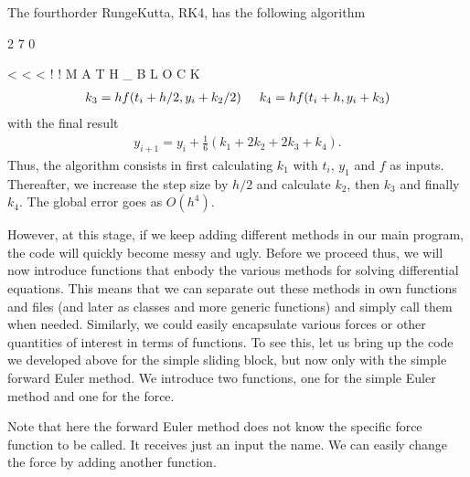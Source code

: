 \documentclass[letterpaper,10pt,english]{sphinxmanual}
\begin{document}
The fourth\sphinxhyphen{}order Runge\sphinxhyphen{}Kutta, RK4, has the following algorithm

2
7
0

\textless{}
\textless{}
\textless{}
!
!
M
A
T
H
\_
B
L
O
C
K
\begin{equation*}
\begin{split}
k_3=hf(t_i+h/2,y_i+k_2/2)\hspace{0.5cm}   k_4=hf(t_i+h,y_i+k_3)
\end{split}
\end{equation*}
with the final result
\begin{equation*}
\begin{split}
y_{i+1}=y_i +\frac{1}{6}\left( k_1 +2k_2+2k_3+k_4\right).
\end{split}
\end{equation*}
Thus, the algorithm consists in first calculating \(k_1\)
with \(t_i\), \(y_1\) and \(f\) as inputs. Thereafter, we increase the step
size by \(h/2\) and calculate \(k_2\), then \(k_3\) and finally \(k_4\). The global error goes as \(O(h^4)\).

However, at this stage, if we keep adding different methods in our
main program, the code will quickly become messy and ugly. Before we
proceed thus, we will now introduce functions that enbody the various
methods for solving differential equations. This means that we can
separate out these methods in own functions and files (and later as classes and more
generic functions) and simply call them when needed. Similarly, we
could easily encapsulate various forces or other quantities of
interest in terms of functions. To see this, let us bring up the code
we developed above for the simple sliding block, but now only with the simple forward Euler method. We introduce
two functions, one for the simple Euler method and one for the
force.

Note that here the forward Euler method does not know the specific force function to be called.
It receives just an input the name. We can easily change the force by adding another function.

\begin{sphinxVerbatim}[commandchars=\\\{\}]
 
       
        \PYG{p}{[}\PYG{p}{]}  \PYG{p}{[}\PYG{p}{]}  \PYG{p}{[}\PYG{p}{]}\PYG{p}{[}\PYG{p}{]}\PYG{p}{[}\PYG{p}{]}
        \PYG{p}{[}\PYG{p}{]}  \PYG{p}{[}\PYG{p}{]}  \PYG{p}{[}\PYG{p}{]}
        \PYG{p}{[}\PYG{p}{]}  \PYG{p}{[}\PYG{p}{]}  
\end{sphinxVerbatim}
\end{document}
